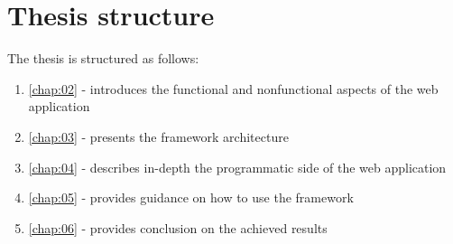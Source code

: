 \section{Thesis structure}
\label{chap:01:03}

The thesis is structured as follows:

\begin{enumerate}
	\item \autoref{chap:02} - introduces the functional and nonfunctional aspects of the web application
	\item \autoref{chap:03} - presents the framework architecture
	\item \autoref{chap:04} - describes in-depth the programmatic side of the web application 
	\item \autoref{chap:05} - provides guidance on how to use the framework 
	\item \autoref{chap:06} - provides conclusion on the achieved results
\end{enumerate}
